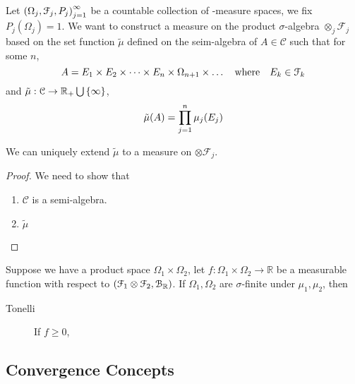 Let \(\pqty{\Omega_{j}, \mathcal{F}_{j}, P_{j}}_{j = 1}^{\infty}\) be a countable collection of -measure spaces, we fix \(P_{j}(\Omega_{j}) = 1\). We want to construct a measure on the product \(\sigma\)-algebra \(\otimes_{j} \mathcal{F}_{j}\) based on the set function \(\tilde{\mu}\) defined on the seim-algebra of  \(A \in \mathcal{C}\) such that for some \(n\), 
\begin{equation*}
    A = E_{1} \times E_{2} \times \dots \times E_{n} \times \Omega_{n+1} \times \dots \qq{where} E_{k} \in \mathcal{F}_{k}
\end{equation*}
and \(\tilde{\mu}: \mathcal{C} \to \mathbb{R}_{+}\cup \Bqty{\infty}\),
\begin{equation*}
    \tilde{\mu}(A) = \prod_{j = 1}^{n} \mu_{j}\pqty{E_{j}}
\end{equation*}

\begin{thm}
    We can uniquely extend \(\tilde{\mu}\) to a measure on \(\otimes \mathcal{F}_{j}\). 
\end{thm}
\begin{proof}
    We need to show that 
    \begin{enumerate}
        \item \(\mathcal{C}\) is a semi-algebra.
        \item \(\tilde{\mu} \) 
    \end{enumerate}
\end{proof}


\begin{thm}
    Suppose we have a product space \(\Omega_{1}\times \Omega_{2}\), let \(f: \Omega_{1}\times \Omega_{2} \to \mathbb{R}\) be a measurable function with respect to \(\pqty{\mathcal{F}_{1} \otimes \mathcal{F}_{2}, \mathcal{B}_{\mathbb{R}}}\). If \(\Omega_{1}, \Omega_{2}\) are \(\sigma\)-finite under \(\mu_{1}, \mu_{2}\), then
    \begin{description}
        \item[Tonelli] If \(f\geq 0\), 
    \end{description}
\end{thm}

\subsection{Convergence Concepts}


